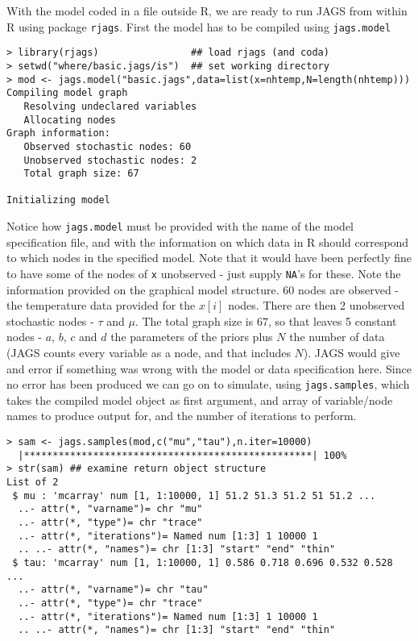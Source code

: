 \documentclass[10pt] {article}
\theoremstyle{definition}
\begin{document}
With the model coded in a file outside R, we are ready to run JAGS from within R using package {\tt rjags}. First the model has to be compiled using {\tt jags.model}
\begin{lstlisting}
> library(rjags)                ## load rjags (and coda)
> setwd("where/basic.jags/is")  ## set working directory
> mod <- jags.model("basic.jags",data=list(x=nhtemp,N=length(nhtemp)))
Compiling model graph
   Resolving undeclared variables
   Allocating nodes
Graph information:
   Observed stochastic nodes: 60
   Unobserved stochastic nodes: 2
   Total graph size: 67

Initializing model
\end{lstlisting}
Notice how {\tt jags.model} must be provided with the name of the model specification file, and with the information on which data in R should correspond to which nodes in the  specified model. Note that it would have been perfectly fine to have some of the nodes of {\tt x} unobserved - just supply {\tt NA}'s for these. Note the information provided on the graphical model structure. 60 nodes are observed - the temperature data provided for the $x[i]$ nodes. There are then 2 unobserved stochastic nodes - $\tau$ and $\mu$. The total graph size is 67, so that leaves 5 constant nodes - $a$, $b$, $c$ and $d$ the parameters of the priors plus $N$ the number of data (JAGS counts every variable as a node, and that includes $N$). JAGS would give and error if something was wrong with the model or data specification here. Since no error has been produced we can go on to simulate, using {\tt jags.samples}, which takes the compiled model object as first argument, and array of variable/node names to produce output for, and the number of iterations to perform.   
\begin{lstlisting}
> sam <- jags.samples(mod,c("mu","tau"),n.iter=10000)
  |**************************************************| 100%
> str(sam) ## examine return object structure
List of 2
 $ mu : 'mcarray' num [1, 1:10000, 1] 51.2 51.3 51.2 51 51.2 ...
  ..- attr(*, "varname")= chr "mu"
  ..- attr(*, "type")= chr "trace"
  ..- attr(*, "iterations")= Named num [1:3] 1 10000 1
  .. ..- attr(*, "names")= chr [1:3] "start" "end" "thin"
 $ tau: 'mcarray' num [1, 1:10000, 1] 0.586 0.718 0.696 0.532 0.528 ...
  ..- attr(*, "varname")= chr "tau"
  ..- attr(*, "type")= chr "trace"
  ..- attr(*, "iterations")= Named num [1:3] 1 10000 1
  .. ..- attr(*, "names")= chr [1:3] "start" "end" "thin"
\end{lstlisting}
\end{document}
